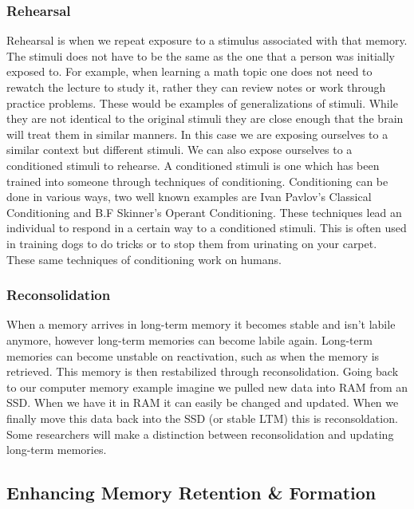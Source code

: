 \documentclass{article}[12pt]
\begin{document}
\subsubsection{Rehearsal}
Rehearsal is when we repeat exposure to a stimulus associated with that memory. The stimuli does not have to be the same as the one that a person was initially exposed to. For example, when learning a math topic one does not need to rewatch the lecture to study it, rather they can review notes or work through practice problems. These would be examples of generalizations of stimuli. While they are not identical to the original stimuli they are close enough that the brain will treat them in similar manners. In this case we are exposing ourselves to a similar context but different stimuli. We can also expose ourselves to a conditioned stimuli to rehearse. A conditioned stimuli is one which has been trained into someone through techniques of conditioning. Conditioning can be done in various ways, two well known examples are Ivan Pavlov's Classical Conditioning and B.F Skinner's Operant Conditioning. These techniques lead an individual to respond in a certain way to a conditioned stimuli. This is often used in training dogs to do tricks or to stop them from urinating on your carpet. These same techniques of conditioning work on humans.

\subsubsection{Reconsolidation}
When a memory arrives in long-term memory it becomes stable and isn't labile anymore, however long-term memories can become labile again. Long-term memories can become unstable on reactivation, such as when the memory is retrieved. This memory is then restabilized through reconsolidation. Going back to our computer memory example imagine we pulled new data into RAM from an SSD. When we have it in RAM it can easily be changed and updated. When we finally move this data back into the SSD (or stable LTM) this is reconsoldation. Some researchers will make a distinction between reconsolidation and updating long-term memories.

\subsection{Enhancing Memory Retention \& Formation}
\end{document}
